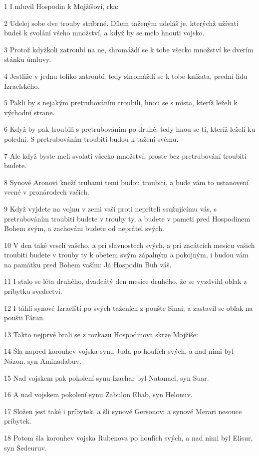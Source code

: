 \par 1 I mluvil Hospodin k Mojžíšovi, rka:
\par 2 Udelej sobe dve trouby stríbrné. Dílem taženým udeláš je, kterýchž užívati budeš k svolání všeho množství, a když by se melo hnouti vojsko.
\par 3 Protož kdyžkoli zatroubí na ne, shromáždí se k tobe všecko množství ke dverím stánku úmluvy.
\par 4 Jestliže v jednu toliko zatroubí, tedy shromáždí se k tobe knížata, prední lidu Izraelského.
\par 5 Pakli by s nejakým pretrubováním troubili, hnou se s místa, kteríž leželi k východní strane.
\par 6 Když by pak troubili s pretrubováním po druhé, tedy hnou se ti, kteríž leželi ku poledni. S pretrubováním troubiti budou k tažení svému.
\par 7 Ale když byste meli svolati všecko množství, proste bez pretrubování troubiti budete.
\par 8 Synové Aronovi kneží trubami temi budou troubiti, a bude vám to ustanovení vecné v pronárodech vašich.
\par 9 Když vyjdete na vojnu v zemi vaší proti nepríteli ssužujícímu vás, s pretrubováním troubiti budete v trouby ty, a budete v pameti pred Hospodinem Bohem svým, a zachováni budete od neprátel svých.
\par 10 V den také veselí vašeho, a pri slavnostech svých, a pri zacátcích mesícu vašich troubiti budete v trouby ty k obetem svým zápalným a pokojným, i budou vám na památku pred Bohem vaším: Já Hospodin Buh váš.
\par 11 I stalo se léta druhého, dvadcátý den mesíce druhého, že se vyzdvihl oblak z príbytku svedectví.
\par 12 I táhli synové Izraelští po svých taženích z poušte Sinai; a zastavil se oblak na poušti Fáran.
\par 13 Takto nejprvé brali se z rozkazu Hospodinova skrze Mojžíše:
\par 14 Šla napred korouhev vojska synu Juda po houfích svých, a nad nimi byl Názon, syn Aminadabuv.
\par 15 Nad vojskem pak pokolení synu Izachar byl Natanael, syn Suar.
\par 16 A nad vojskem pokolení synu Zabulon Eliab, syn Helonuv.
\par 17 Složen jest také i príbytek, a šli synové Gersonovi a synové Merari nesouce príbytek.
\par 18 Potom šla korouhev vojska Rubenova po houfích svých, a nad nimi byl Elisur, syn Sedeuruv.
